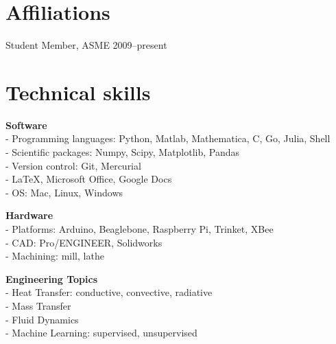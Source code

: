 \documentclass[]{res}
\begin{document}
\begin{resume}

\section{Affiliations}
\vspace{0.1in}
Student Member, ASME \hfill 2009--present \\


\section{Technical skills}
\vspace{0.1in}

\textbf{Software} \\
- Programming languages: Python, Matlab, Mathematica, C, Go, Julia, Shell \\
- Scientific packages: Numpy, Scipy, Matplotlib, Pandas \\
- Version control: Git, Mercurial \\
- LaTeX, Microsoft Office, Google Docs \\
- OS: Mac, Linux, Windows \\

\vspace{-0.2in}

\textbf{Hardware} \\
- Platforms: Arduino, Beaglebone, Raspberry Pi, Trinket, XBee \\
- CAD: Pro/ENGINEER, Solidworks \\
- Machining: mill, lathe \\

\vspace{-0.2in}

\textbf{Engineering Topics} \\
- Heat Transfer: conductive, convective, radiative \\
- Mass Transfer \\
- Fluid Dynamics \\
- Machine Learning: supervised, unsupervised \\


\end{resume}
\end{document}
